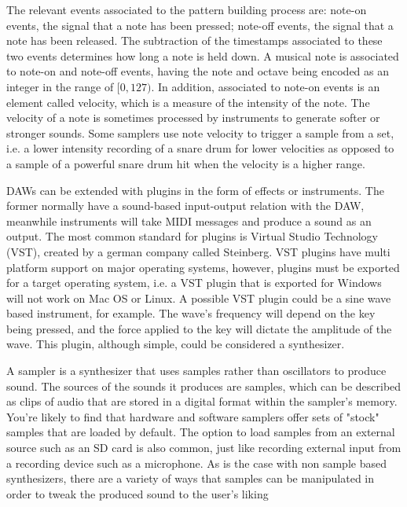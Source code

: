 \documentclass[12pt, a4paper, hidelinks]{article}
\begin{document}
	The relevant events associated to the pattern building process are: note-on events, the signal that a note has been pressed; note-off events, the signal that a note has been released. The subtraction of the timestamps associated to these two events determines how long a note is held down. A musical note is associated to note-on and note-off events, having the note and octave being encoded as an integer in the range of $[0, 127)$. In addition, associated to note-on events is an element called velocity, which is a measure of the intensity of the note. The velocity of a note is sometimes processed by instruments to generate softer or stronger sounds. Some samplers use note velocity to trigger a sample from a set, i.e. a lower intensity recording of a snare drum for lower velocities as opposed to a sample of a powerful snare drum hit when the velocity is a higher range.
 	\par
 	
	DAWs can be extended with plugins in the form of effects or instruments. The former normally have a sound-based input-output relation with the DAW, meanwhile instruments will take MIDI messages and produce a sound as an output. The most common standard for plugins is Virtual Studio Technology (VST), created by a german company called Steinberg. VST plugins have multi platform support on major operating systems, however, plugins must be exported for a target operating system, i.e. a VST plugin that is exported for Windows will not work on Mac OS or Linux. A possible VST plugin could be a sine wave based instrument, for example. The wave's frequency will depend on the key being pressed, and the force applied to the key will dictate the amplitude of the wave. This plugin, although simple, could be considered a synthesizer. \par 
	A sampler is a synthesizer that uses samples rather than oscillators to produce sound.  The sources of the sounds it produces are samples, which can be described as clips of audio that are stored in a digital format within the sampler's memory. You're likely to find that hardware and software samplers offer sets of "stock" samples that are loaded by default. The option to load samples from an external source such as an SD card is also common, just like recording external input from a recording device such as a microphone. As is the case with non sample based synthesizers, there are a variety of ways that samples can be manipulated in order to tweak the produced sound to the user's liking\par
	
\end{document}
